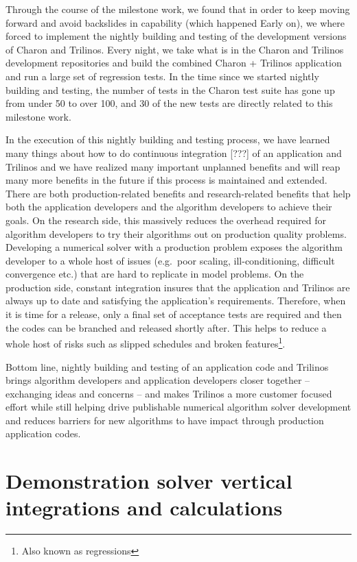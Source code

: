 \documentclass[pdf,ps2pdf,11pt]{SANDreport}
\begin{document}
Through the course of the milestone work, we found that in order to keep
moving forward and avoid backslides in capability (which happened Early on),
we where forced to implement the nightly building and testing of the
development versions of Charon and Trilinos.  Every night, we take what is in
the Charon and Trilinos development repositories and build the combined Charon
+ Trilinos application and run a large set of regression tests.  In the time
since we started nightly building and testing, the number of tests in the
Charon test suite has gone up from under 50 to over 100, and 30 of the new
tests are directly related to this milestone work.

In the execution of this nightly building and testing process, we have learned
many things about how to do continuous integration [???] of an application and
Trilinos and we have realized many important unplanned benefits and will reap
many more benefits in the future if this process is maintained and extended.
There are both production-related benefits and research-related benefits that
help both the application developers and the algorithm developers to achieve
their goals.  On the research side, this massively reduces the overhead
required for algorithm developers to try their algorithms out on production
quality problems.  Developing a numerical solver with a production problem
exposes the algorithm developer to a whole host of issues (e.g.\ poor scaling,
ill-conditioning, difficult convergence etc.) that are hard to replicate in
model problems.  On the production side, constant integration insures that the
application and Trilinos are always up to date and satisfying the
application's requirements.  Therefore, when it is time for a release, only a
final set of acceptance tests are required and then the codes can be branched
and released shortly after.  This helps to reduce a whole host of risks such
as slipped schedules and broken features\footnote{Also known as regressions}.

Bottom line, nightly building and testing of an application code and Trilinos
brings algorithm developers and application developers closer together --
exchanging ideas and concerns -- and makes Trilinos a more customer focused
effort while still helping drive publishable numerical algorithm solver
development and reduces barriers for new algorithms to have impact through
production application codes.


%
\section{Demonstration solver vertical integrations and calculations}
\label{sec:demonstration}
%
\end{document}
